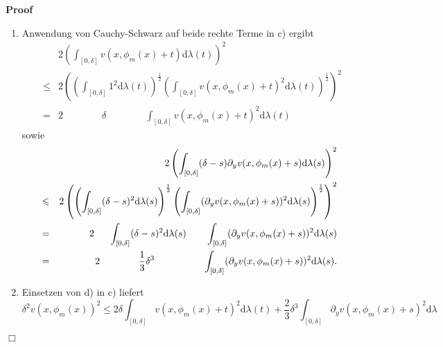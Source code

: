 \documentclass{book}
\newcommand{\mathd}{\mathrm{d}}
\newenvironment{enumeratealpha}{\begin{enumerate}[a{\textup{)}}] }{\end{enumerate}}
\newenvironment{proof}{\noindent\textbf{Proof\ }}{\hspace*{\fill}$\Box$\medskip}
\begin{document}
\begin{proof}
\begin{enumeratealpha}
    \begin{eqnarray*}
      \delta^2 v (x, \phi_m (x))^2 & \leqslant & 2 \left( \int_{[0, \delta]} v
      (x, \phi_m (x) + t) \mathd \lambda (t) \right)^2\\
      &  & \text{\qquad} + 2 \left( \int_{[0, \delta]} (\delta - s)
      \partial_y v (x, \phi_m (x) + s) \mathd \lambda (s) \right)^2 .
    \end{eqnarray*}
    \item Anwendung von Cauchy-Schwarz auf beide rechte Terme in c) ergibt
    \begin{eqnarray*}
      &  & 2 \left( \int_{[0, \delta]} v (x, \phi_m (x) + t) \mathd \lambda
      (t) \right)^2\\
      & \leqslant & 2 \left( \left( \int_{[0, \delta]} 1^2 \mathd \lambda (t)
      \right)^{\frac{1}{2}} \left( \int_{[0, \delta]} v (x, \phi_m (x) + t)^2
      \mathd \lambda (t) \right)^{\frac{1}{2}} \right)^2\\
      & = & 2 \hspace{4em} \delta \hspace{4em} \int_{[0, \delta]} v (x,
      \phi_m (x) + t)^2 \mathd \lambda (t)
    \end{eqnarray*}
    sowie
    \begin{eqnarray*}
      &  & 2 \left( \int_{[0, \delta]} (\delta - s) \partial_y v (x, \phi_m
      (x) + s) \mathd \lambda (s) \right)^2\\
      & \leqslant & 2 \left( \left( \int_{[0, \delta]} (\delta - s)^2 \mathd
      \lambda (s) \right)^{\frac{1}{2}} \left( \int_{[0, \delta]} (\partial_y
      v (x, \phi_m (x) + s))^2 \mathd \lambda (s) \right)^{\frac{1}{2}}
      \right)^2\\
      & = & 2 \hspace{1.5em} \int_{[0, \delta]} (\delta - s)^2 \mathd \lambda
      (s) \qquad \int_{[0, \delta]} (\partial_y v (x, \phi_m (x) + s))^2
      \mathd \lambda (s)\\
      & = & 2 \hspace{4em} \frac{1}{3} \delta^3 \hspace{5em} \int_{[0,
      \delta]} (\partial_y v (x, \phi_m (x) + s))^2 \mathd \lambda (s) .
    \end{eqnarray*}
    \item Einsetzen von d) in c) liefert
    \[ \delta^2 v (x, \phi_m (x))^2 \leqslant 2 \delta \int_{[0, \delta]} v
       (x, \phi_m (x) + t)^2 \mathd \lambda (t) + \frac{2}{3} \delta^3
       \int_{[0, \delta]} \partial_y v (x, \phi_m (x) + s)^2 \mathd \lambda
\]
\end{enumeratealpha}
\end{proof}
\end{document}
